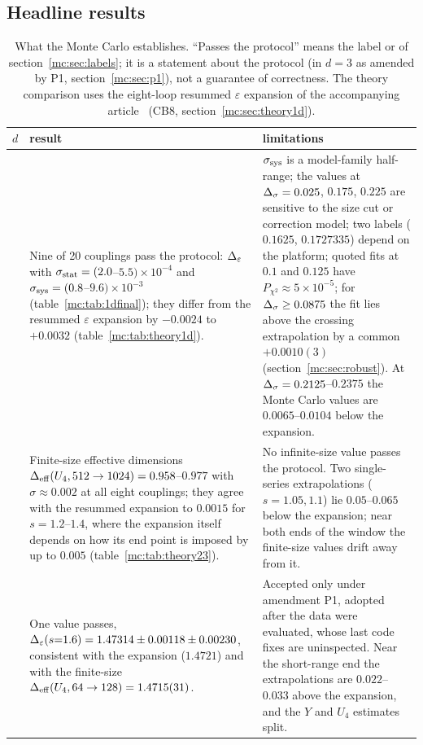 \subsection{Headline results}
\begin{table}[htbp]\centering\small
\caption{What the Monte Carlo establishes. ``Passes the protocol'' means the label  or  of
section~\ref{mc:sec:labels}; it is a statement about the protocol (in $d=3$ as amended by P1, section~\ref{mc:sec:p1}), not a guarantee of
correctness. The theory comparison uses the eight-loop resummed $\varepsilon$ expansion of the accompanying article~\cite{mc:Zheng:2026ai}
(CB8, section~\ref{mc:sec:theory1d}).}\label{mc:tab:headline}
\begin{tabular}{@{}>{\raggedright\arraybackslash}p{0.7cm}>{\raggedright\arraybackslash}p{7.2cm}>{\raggedright\arraybackslash}p{7.6cm}@{}}\toprule
$d$ & result & limitations \\\midrule
1 & Nine of 20 couplings pass the protocol: $\Delta_\varepsilon$ with $\sigma_{\rm stat}=(2.0$--$5.5)\times10^{-4}$ and $\sigma_{\rm sys}=(0.8$--$9.6)\times10^{-3}$ (table~\ref{mc:tab:1dfinal}); they differ from the resummed $\varepsilon$ expansion by $-0.0024$ to $+0.0032$ (table~\ref{mc:tab:theory1d}). &
$\sigma_{\rm sys}$ is a model-family half-range; the values at $\Delta_\sigma=0.025$, $0.175$, $0.225$ are sensitive to the size cut or correction model; two labels ($0.1625$, $0.1727335$) depend on the platform; quoted fits at $0.1$ and $0.125$ have $P_{\chi^2}\approx5\times10^{-5}$; for $\Delta_\sigma\ge0.0875$ the fit lies above the crossing extrapolation by a common $+0.0010(3)$ (section~\ref{mc:sec:robust}). At $\Delta_\sigma=0.2125$--$0.2375$ the Monte Carlo values are $0.0065$--$0.0104$ below the expansion. \\
2 & Finite-size effective dimensions $\Delta_{\rm eff}(U_4,512\to1024)=0.958$--$0.977$ with $\sigma\approx0.002$ at all eight couplings; they agree with the resummed expansion to $0.0015$ for $s=1.2$--$1.4$, where the expansion itself depends on how its end point is imposed by up to $0.005$ (table~\ref{mc:tab:theory23}). &
No infinite-size value passes the protocol. Two single-series extrapolations ($s=1.05,1.1$) lie $0.05$--$0.065$ below the expansion; near both ends of the window the finite-size values drift away from it. \\
3 & One value passes, $\Delta_\varepsilon(s{=}1.6)=1.47314\pm0.00118\pm0.00230$, consistent with the expansion ($1.4721$) and with the finite-size $\Delta_{\rm eff}(U_4,64\to128)=1.4715(31)$. &
Accepted only under amendment P1, adopted after the data were evaluated, whose last code fixes are uninspected. Near the short-range end the extrapolations are $0.022$--$0.033$ above the expansion, and the $Y$ and $U_4$ estimates split. \\\bottomrule
\end{tabular}
\end{table}

